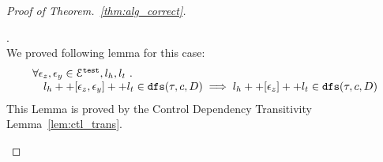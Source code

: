 \begin{proof}[Proof of Theorem.~\ref{thm:alg_correct}]
\begin{case}
\begin{subcase}[ $l_e = l_h ++ {[\event_z, \event_b, \event_y]} ++ l_t$ ]
\end{subcase}
%
%
\begin{subcase}[ $l_e = l_h ++ {[\event_{b_1}, \cdots, \event_{b_n}]} ++ l_t$ ].
%
\\
We proved following lemma for this case:
\begin{equation}
  \begin{array}{l}
    \forall \mathtt{\epsilon}_z, \mathtt{\epsilon}_y \in \mathcal{E}^{\mathtt{{test}}}, l_h, l_t ~.~
     \\ \quad 
     l_h ++ [\mathtt{\epsilon}_z, \mathtt{\epsilon}_y] ++ l_t \in \mathtt{dfs}(\mathtt{\tau}, c, D)
    \implies l_h ++ [\mathtt{\epsilon}_z] ++ l_t \in \mathtt{dfs}(\mathtt{\tau}, c, D)
  \end{array}
  \end{equation}
%
This Lemma is proved by the Control Dependency Transitivity Lemma~\ref{lem:ctl_trans}.
\end{subcase}
%
\end{case}
%
\end{proof}